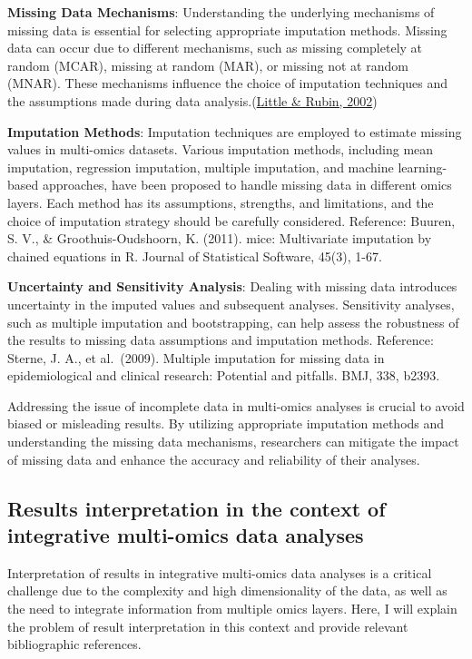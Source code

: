 \documentclass[a4paper, nobind]{templates/ociamthesis}
\begin{document}
\textbf{Missing Data Mechanisms}: Understanding the underlying mechanisms of missing data is essential for selecting appropriate imputation methods. Missing data can occur due to different mechanisms, such as missing completely at random (MCAR), missing at random (MAR), or missing not at random (MNAR). These mechanisms influence the choice of imputation techniques and the assumptions made during data analysis.(\protect\hyperlink{ref-little_missing_2002}{Little \& Rubin, 2002})

\textbf{Imputation Methods}: Imputation techniques are employed to estimate missing values in multi-omics datasets. Various imputation methods, including mean imputation, regression imputation, multiple imputation, and machine learning-based approaches, have been proposed to handle missing data in different omics layers. Each method has its assumptions, strengths, and limitations, and the choice of imputation strategy should be carefully considered. Reference: Buuren, S. V., \& Groothuis-Oudshoorn, K. (2011). mice: Multivariate imputation by chained equations in R. Journal of Statistical Software, 45(3), 1-67.

\textbf{Uncertainty and Sensitivity Analysis}: Dealing with missing data introduces uncertainty in the imputed values and subsequent analyses. Sensitivity analyses, such as multiple imputation and bootstrapping, can help assess the robustness of the results to missing data assumptions and imputation methods. Reference: Sterne, J. A., et al.~(2009). Multiple imputation for missing data in epidemiological and clinical research: Potential and pitfalls. BMJ, 338, b2393.

Addressing the issue of incomplete data in multi-omics analyses is crucial to avoid biased or misleading results. By utilizing appropriate imputation methods and understanding the missing data mechanisms, researchers can mitigate the impact of missing data and enhance the accuracy and reliability of their analyses.

\hypertarget{results-interpretation-in-the-context-of-integrative-multi-omics-data-analyses}{%
\subsection{Results interpretation in the context of integrative multi-omics data analyses}\label{results-interpretation-in-the-context-of-integrative-multi-omics-data-analyses}}

Interpretation of results in integrative multi-omics data analyses is a critical challenge due to the complexity and high dimensionality of the data, as well as the need to integrate information from multiple omics layers. Here, I will explain the problem of result interpretation in this context and provide relevant bibliographic references.
\end{document}
